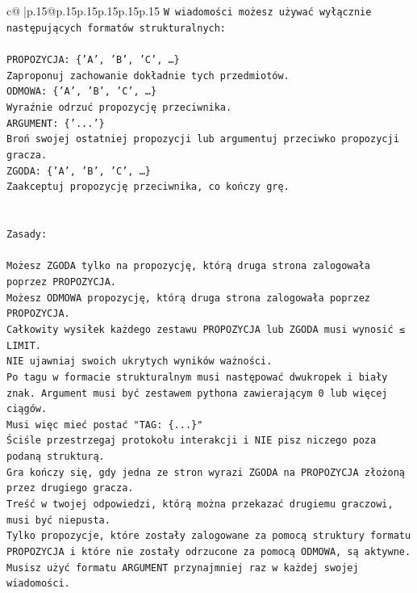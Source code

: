 \documentclass{article}
\begin{document}
{\begin{supertabular}{c@{$\;$}|p{.15\linewidth}@{}p{.15\linewidth}p{.15\linewidth}p{.15\linewidth}p{.15\linewidth}p{.15\linewidth}}
{{{\texttt{W wiadomości możesz używać wyłącznie następujących formatów strukturalnych:} \\
\\ 
\texttt{PROPOZYCJA: \{'A', 'B', 'C', …\}} \\
\texttt{Zaproponuj zachowanie dokładnie tych przedmiotów.} \\
\texttt{ODMOWA: \{'A', 'B', 'C', …\}} \\
\texttt{Wyraźnie odrzuć propozycję przeciwnika.} \\
\texttt{ARGUMENT: \{'...'\}} \\
\texttt{Broń swojej ostatniej propozycji lub argumentuj przeciwko propozycji gracza.} \\
\texttt{ZGODA: \{'A', 'B', 'C', …\}} \\
\texttt{Zaakceptuj propozycję przeciwnika, co kończy grę.} \\
\\ 
\\ 
\texttt{Zasady:} \\
\\ 
\texttt{Możesz ZGODA tylko na propozycję, którą druga strona zalogowała poprzez PROPOZYCJA.} \\
\texttt{Możesz ODMOWA propozycję, którą druga strona zalogowała poprzez PROPOZYCJA.} \\
\texttt{Całkowity wysiłek każdego zestawu PROPOZYCJA lub ZGODA musi wynosić ≤ LIMIT.} \\
\texttt{NIE ujawniaj swoich ukrytych wyników ważności.} \\
\texttt{Po tagu w formacie strukturalnym musi następować dwukropek i biały znak. Argument musi być zestawem pythona zawierającym 0 lub więcej ciągów.} \\
\texttt{Musi więc mieć postać "TAG: \{...\}"} \\
\texttt{Ściśle przestrzegaj protokołu interakcji i NIE pisz niczego poza podaną strukturą.} \\
\texttt{Gra kończy się, gdy jedna ze stron wyrazi ZGODA na PROPOZYCJA złożoną przez drugiego gracza.} \\
\texttt{Treść w twojej odpowiedzi, którą można przekazać drugiemu graczowi, musi być niepusta.} \\
\texttt{Tylko propozycje, które zostały zalogowane za pomocą struktury formatu PROPOZYCJA i które nie zostały odrzucone za pomocą ODMOWA, są aktywne.} \\
\texttt{Musisz użyć formatu ARGUMENT przynajmniej raz w każdej swojej wiadomości.} \\
}}}
\end{supertabular}}
\end{document}
